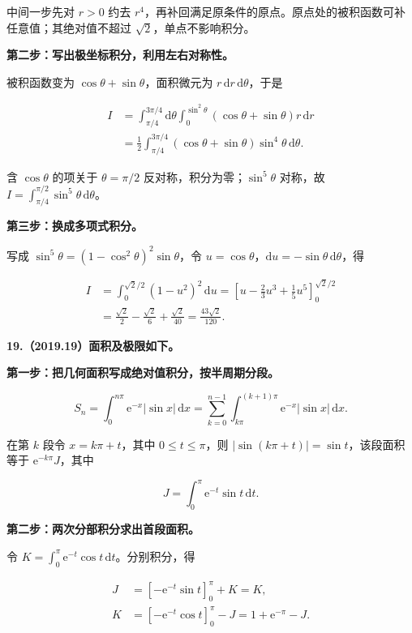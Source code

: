 \documentclass[UTF8,11pt,fontset=windows]{ctexart}
\begin{document}
中间一步先对 $r>0$ 约去 $r^4$，再补回满足原条件的原点。原点处的被积函数可补任意值；其绝对值不超过 $\sqrt2$，单点不影响积分。

\textbf{第二步：写出极坐标积分，利用左右对称性。}

被积函数变为 $\cos\theta+\sin\theta$，面积微元为 $r\,\mathrm dr\,\mathrm d\theta$，于是

$$
\begin{aligned}
I&=\int_{\pi/4}^{3\pi/4}\!\mathrm d\theta
\int_0^{\sin^2\theta}(\cos\theta+\sin\theta)r\,\mathrm dr\\
&=\frac12\int_{\pi/4}^{3\pi/4}(\cos\theta+\sin\theta)\sin^4\theta\,\mathrm d\theta.
\end{aligned}
$$

含 $\cos\theta$ 的项关于 $\theta=\pi/2$ 反对称，积分为零；$\sin^5\theta$ 对称，故 $I=\int_{\pi/4}^{\pi/2}\sin^5\theta\,\mathrm d\theta$。

\textbf{第三步：换成多项式积分。}

写成 $\sin^5\theta=(1-\cos^2\theta)^2\sin\theta$，令 $u=\cos\theta$，$\mathrm du=-\sin\theta\,\mathrm d\theta$，得

$$
\begin{aligned}
I&=\int_0^{\sqrt2/2}(1-u^2)^2\,\mathrm du
=\left[u-\frac23u^3+\frac15u^5\right]_0^{\sqrt2/2}\\
&=\frac{\sqrt2}{2}-\frac{\sqrt2}{6}+\frac{\sqrt2}{40}
=\boxed{\frac{43\sqrt2}{120}}.
\end{aligned}
$$

\clearpage

\textbf{19.（2019.19）面积及极限如下。}

\textbf{第一步：把几何面积写成绝对值积分，按半周期分段。}

$$
S_n=\int_0^{n\pi}\mathrm e^{-x}|\sin x|\,\mathrm dx
=\sum_{k=0}^{n-1}\int_{k\pi}^{(k+1)\pi}\mathrm e^{-x}|\sin x|\,\mathrm dx.
$$

在第 $k$ 段令 $x=k\pi+t$，其中 $0\le t\le\pi$，则 $|\sin(k\pi+t)|=\sin t$，该段面积等于 $\mathrm e^{-k\pi}J$，其中

$$
J=\int_0^\pi\mathrm e^{-t}\sin t\,\mathrm dt.
$$

\textbf{第二步：两次分部积分求出首段面积。}

令 $K=\int_0^\pi\mathrm e^{-t}\cos t\,\mathrm dt$。分别积分，得

$$
\begin{aligned}
J&=\left[-\mathrm e^{-t}\sin t\right]_0^\pi+K=K,\\
K&=\left[-\mathrm e^{-t}\cos t\right]_0^\pi-J
=1+\mathrm e^{-\pi}-J.
\end{aligned}
$$
\end{document}
